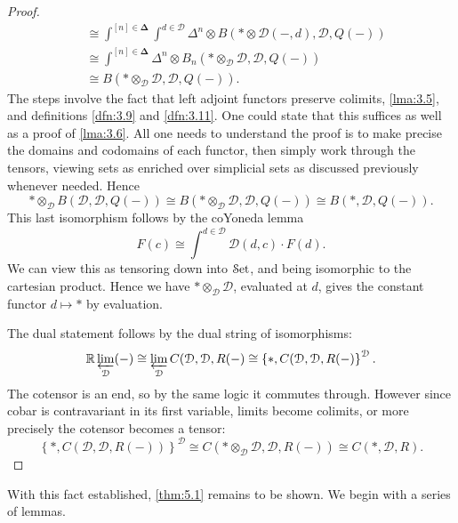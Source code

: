 \begin{proof}
\begin{align*}
									   &\cong\int^{[n]\in\boldsymbol{\Delta} } \int^{d\in \mathcal{D} } \Delta^n\otimes B(*\otimes \mathcal{D} (-,d),\mathcal{D} ,Q(-))\\
									   &\cong \int^{[n]\in\boldsymbol{\Delta} } \Delta^n \otimes B_n(*\otimes _\mathcal{D} \mathcal{D},\mathcal{D} ,Q(-))\\
									   &\cong B(*\otimes_\mathcal{D} \mathcal{D} ,\mathcal{D} ,Q(-))
	.\end{align*}
	The steps involve the fact that left adjoint functors preserve colimits, \cref{lma:3.5}, and definitions \ref{dfn:3.9} and \ref{dfn:3.11}. One could state that this suffices as well as a proof of \cref{lma:3.6}. All one needs to understand the proof is to make precise the domains and codomains of each functor, then simply work through the tensors, viewing sets as enriched over simplicial sets as discussed previously whenever needed. Hence
	\[
		*\otimes _\mathcal{D} B(\mathcal{D} ,\mathcal{D} ,Q(-))\cong B(*\otimes _\mathcal{D} \mathcal{D} ,\mathcal{D} ,Q(-))\cong B(*,\mathcal{D} ,Q(-))
	.\]
	This last isomorphism follows by the coYoneda lemma
	\[
		F(c)\cong \int^{d\in \mathcal{D} } \mathcal{D} (d,c)\cdot F(d)
	.\]
	We can view this as tensoring down into $\mathcal{S}\mathrm{et} $, and being isomorphic to the cartesian product. Hence we have $*\otimes _\mathcal{D} \mathcal{D} $, evaluated at $d$, gives the constant functor $d\mapsto *$ by evaluation.

	The dual statement follows by the dual string of isomorphisms:
	\[
		\mathbb{R} \varprojlim _\mathcal{D} (-)\cong \varprojlim _\mathcal{D} C(\mathcal{D} ,\mathcal{D} ,R(-)\cong \left\{ *,C(\mathcal{D} ,\mathcal{D} ,R(-) \right\} ^{\mathcal{D} } 
	.\]
	The cotensor is an end, so by the same logic it commutes through. However since cobar is contravariant in its first variable, limits become colimits, or more precisely the cotensor becomes a tensor:
	\[
		\left\{ *,C(\mathcal{D} ,\mathcal{D} ,R(-)) \right\} ^{\mathcal{D} } \cong C(*\otimes _\mathcal{D} \mathcal{D} ,\mathcal{D} ,R(-))\cong C(*,\mathcal{D} ,R)
	.\]
\end{proof}

With this fact established, \cref{thm:5.1} remains to be shown. We begin with a series of lemmas.

